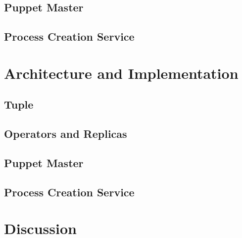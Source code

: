 \documentclass[times, 10pt, twocolumn]{article}
\begin{document}
\subsection{Puppet Master}






\subsection{Process Creation Service}






\section{Architecture and Implementation}





\subsection{Tuple}




\subsection{Operators and Replicas}







\subsection{Puppet Master}






\subsection{Process Creation Service}






\section{Discussion}
\end{document}
